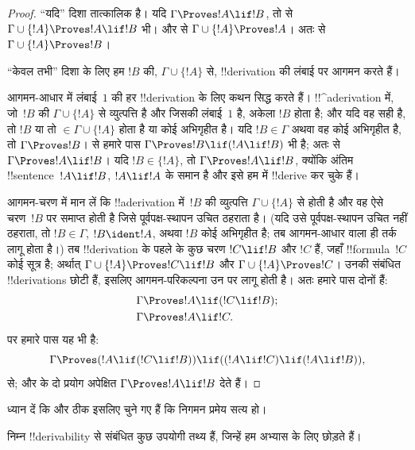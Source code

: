 \documentclass[../../../include/open-logic-section]{subfiles}
\begin{document}
\begin{proof}
``यदि'' दिशा तात्कालिक है। यदि $\Gamma \Proves !A \lif !B$, तो
 से
$\Gamma \cup \{!A\} \Proves !A \lif !B$ भी। और
 से
$\Gamma \cup \{!A\} \Proves !A$। अतः  से $\Gamma \cup
\{!A\} \Proves !B$।

``केवल तभी'' दिशा के लिए हम $!B$ की, $\Gamma \cup \{!A\}$ से,
!!{derivation} की लंबाई पर आगमन करते हैं।

आगमन-आधार में लंबाई~$1$ की हर !!{derivation} के लिए कथन सिद्ध करते हैं।
!!^a{derivation} में, जो~$!B$ की $\Gamma \cup \{!A\}$ से व्युत्पत्ति है और
जिसकी लंबाई~$1$ है, अकेला $!B$ होता है; और यदि वह सही है, तो $!B$ या तो
$\in \Gamma \cup \{!A\}$ होता है या कोई अभिगृहीत है। यदि $!B \in \Gamma$
अथवा वह कोई अभिगृहीत है,
तो $\Gamma \Proves !B$।  से हमारे पास $\Gamma
\Proves !B \lif (!A \lif !B)$ भी है; अतः  से
$\Gamma \Proves !A \lif !B$। यदि $!B \in \{ !A\}$, तो
$\Gamma \Proves !A \lif !B$, क्योंकि अंतिम !!{sentence}~$!A
\lif !B$, $!A \lif !A$ के समान
है और इसे हम  में !!{derive} कर चुके हैं।

आगमन-चरण में मान लें कि !!a{derivation} में~$!B$ की व्युत्पत्ति
$\Gamma \cup \{!A\}$ से होती है और वह ऐसे चरण~$!B$ पर समाप्त होती है जिसे
पूर्वपक्ष-स्थापन उचित ठहराता है। (यदि उसे पूर्वपक्ष-स्थापन उचित नहीं ठहराता,
तो $!B \in \Gamma$, $!B
\ident !A$, अथवा $!B$ कोई अभिगृहीत है; तब आगमन-आधार वाला ही तर्क लागू होता
है।) तब !!{derivation} के पहले के कुछ चरण $!C \lif !B$ और $!C$ हैं, जहाँ
!!{formula}~$!C$ कोई सूत्र है; अर्थात्
$\Gamma \cup \{!A\} \Proves !C \lif !B$ और $\Gamma \cup \{!A\}
\Proves !C$। उनकी संबंधित !!{derivation}s छोटी हैं, इसलिए
आगमन-परिकल्पना उन पर लागू होती है। अतः हमारे पास दोनों हैं:
\begin{align*}
  & \Gamma \Proves !A \lif (!C \lif !B); \\
  & \Gamma \Proves !A \lif !C.
\end{align*}
पर हमारे पास यह भी है:
\[
\Gamma \Proves (!A \lif (!C \lif !B)) \lif
((!A\lif !C)  \lif (!A \lif !B)),
\]
 से; और  के दो प्रयोग अपेक्षित
$\Gamma \Proves !A \lif !B$ देते हैं।
\end{proof}

ध्यान दें कि  और  ठीक इसलिए चुने
गए हैं कि निगमन प्रमेय सत्य हो।

निम्न !!{derivability} से संबंधित कुछ उपयोगी तथ्य हैं, जिन्हें हम अभ्यास के
लिए छोड़ते हैं।
\end{document}
